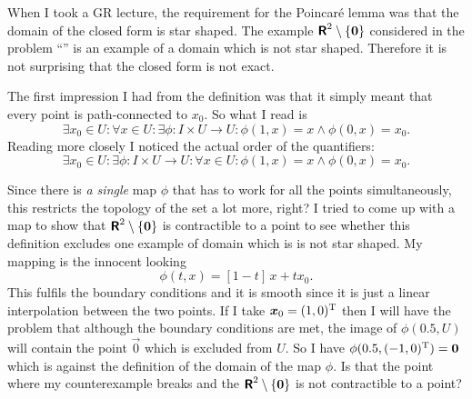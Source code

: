 \documentclass[11pt, english, fleqn, DIV=15, headinclude, BCOR=1cm]{scrartcl}
\begin{document}
\begin{question}
    When I took a GR lecture, the requirement for the Poincaré lemma was that
    the domain of the closed form is star shaped. The example $\R^2 \setminus
    \{ \vec 0 \}$ considered in the problem “” is an
    example of a domain which is not star shaped. Therefore it is not
    surprising that the closed form is not exact.

    The first impression I had from the definition was that it simply meant
    that every point is path-connected to $x_0$. So what I read is
    \[
        \exists x_0 \in U \colon
        \forall x \in U \colon
        \exists \phi \colon I \times U \to U \colon
        \phi(1, x) = x \land \phi(0, x) = x_0.
    \]
    Reading more closely I noticed the actual order of the quantifiers:
    \[
        \exists x_0 \in U \colon
        \exists \phi \colon I \times U \to U \colon
        \forall x \in U \colon
        \phi(1, x) = x \land \phi(0, x) = x_0.
    \]

    Since there is \emph{a single} map $\phi$ that has to work for all the
    points simultaneously, this restricts the topology of the set a lot more,
    right? I tried to come up with a map to show that $\R^2 \setminus \{ \vec 0
    \}$ is contractible to a point to see whether this definition excludes one
    example of domain which is is not star shaped. My mapping is the innocent
    looking
    \[
        \phi(t, x) = [1-t] \, x + t x_0.
    \]
    This fulfils the boundary conditions and it is smooth since it is just a
    linear interpolation between the two points. If I take $\vec x_0 = (1,
    0)^\text T$ then I will have the problem that although the boundary
    conditions are met, the image of $\phi(0.5, U)$ will contain the point
    $\vec 0$ which is excluded from $U$. So I have $\phi(0.5, (-1, 0)^\text T)
    = \vec 0$ which is against the definition of the domain of the map $\phi$.
    Is that the point where my counterexample breaks and the $\R^2 \setminus \{
    \vec 0 \}$ is not contractible to a point?
\end{question}
\end{document}
